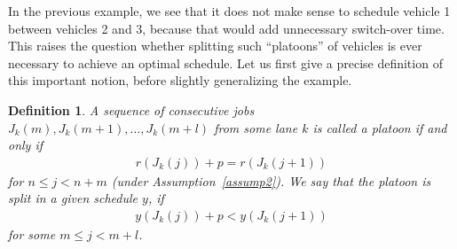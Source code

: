 \documentclass{article}
\theoremstyle{definition}
\theoremstyle{plain}
\newtheorem{define}{Definition}[section]
\begin{document}
In the previous example, we see that it does not make sense to schedule vehicle
1 between vehicles 2 and 3, because that would add unnecessary switch-over
time. This raises the question whether splitting such ``platoons'' of vehicles
is ever necessary to achieve an optimal schedule. Let us first give a precise
definition of this important notion, before slightly generalizing the example.
%
\begin{define}
  A sequence of consecutive jobs $J_{k}(m), J_{k}(m+1), \dots, J_{k}(m+l)$ from
  some lane $k$ is called a {\normalfont platoon} if and only if
  \begin{align}
  r(J_{k}(j)) + p = r(J_{k}(j+1))
  \end{align}
  for $n \leq j < n + m$ (under Assumption~\ref{assump2}). We say that the
  platoon is {\normalfont split} in a given schedule $y$, if
  \begin{align}
  y(J_{k}(j)) + p < y(J_{k}(j+1))
  \end{align}
  for some $m \leq j < m + l$.
\end{define}
%
\end{document}
